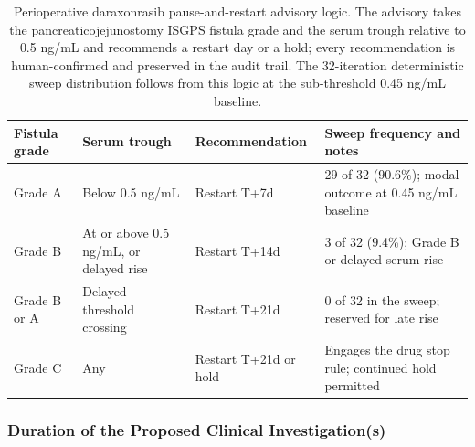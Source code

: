 \begin{table}[t]
\caption{Perioperative daraxonrasib pause-and-restart advisory logic. The advisory
takes the pancreaticojejunostomy ISGPS fistula grade and the serum trough relative
to 0.5 ng/mL and recommends a restart day or a hold; every recommendation is
human-confirmed and preserved in the audit trail. The 32-iteration deterministic
sweep distribution follows from this logic at the sub-threshold 0.45 ng/mL baseline.}
\label{tab:sec02-restart}
\centering
\begin{tabularx}{\textwidth}{L{2.6cm} L{3.4cm} L{2.6cm} Y}
\toprule
\textbf{Fistula grade} & \textbf{Serum trough} & \textbf{Recommendation} & \textbf{Sweep frequency and notes} \\
\midrule
Grade A & Below 0.5 ng/mL & Restart T+7d & 29 of 32 (90.6\%); modal outcome at 0.45 ng/mL baseline \\
Grade B & At or above 0.5 ng/mL, or delayed rise & Restart T+14d & 3 of 32 (9.4\%); Grade B or delayed serum rise \\
Grade B or A & Delayed threshold crossing & Restart T+21d & 0 of 32 in the sweep; reserved for late rise \\
Grade C & Any & Restart T+21d or hold & Engages the drug stop rule; continued hold permitted \\
\bottomrule
\end{tabularx}
\end{table}


\subsubsection{Duration of the Proposed Clinical Investigation(s)}

